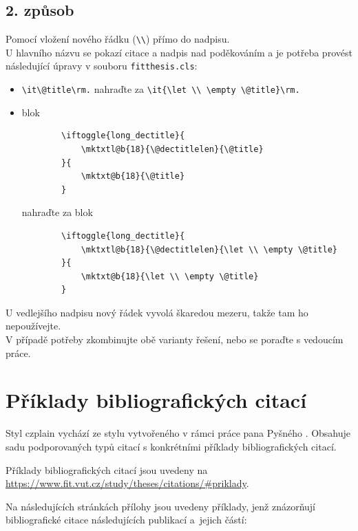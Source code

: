 \section{2. způsob}
Pomocí vložení nového řádku (\verb|\\|) přímo do nadpisu. \\

U hlavního názvu se pokazí citace a nadpis nad poděkováním a je potřeba provést následující úpravy v souboru \texttt{fitthesis.cls}:
\begin{itemize}
	\item \verb|\it\@title\rm.| nahraďte za \verb|\it{\let \\ \empty \@title}\rm.|
	\item blok
	\begin{verbatim}		\iftoggle{long_dectitle}{
			\mktxtl@b{18}{\@dectitlelen}{\@title}
		}{
			\mktxt@b{18}{\@title}
		}		
	\end{verbatim}
	nahraďte za blok
	\begin{verbatim}
		\iftoggle{long_dectitle}{
			\mktxtl@b{18}{\@dectitlelen}{\let \\ \empty \@title}
		}{
			\mktxt@b{18}{\let \\ \empty \@title}
		}
	\end{verbatim}
\end{itemize}
U vedlejšího nadpisu nový řádek vyvolá škaredou mezeru, takže tam ho nepoužívejte. 
\\ \noindent V případě potřeby zkombinujte obě varianty řešení, nebo se poraďte s vedoucím práce.



\chapter{Příklady bibliografických citací}
\label{priloha-priklady-citaci}
Styl czplain vychází ze stylu vytvořeného v rámci práce pana Pyšného \cite{Pysny}. Obsahuje sadu podporovaných typů citací s konkrétními příklady bibliografických citací.

Příklady bibliografických citací jsou uvedeny na \url{https://www.fit.vut.cz/study/theses/citations/#priklady}.

Na následujících stránkách přílohy jsou uvedeny příklady, jenž znázorňují bibliografické citace následujících publikací a~jejich částí:

